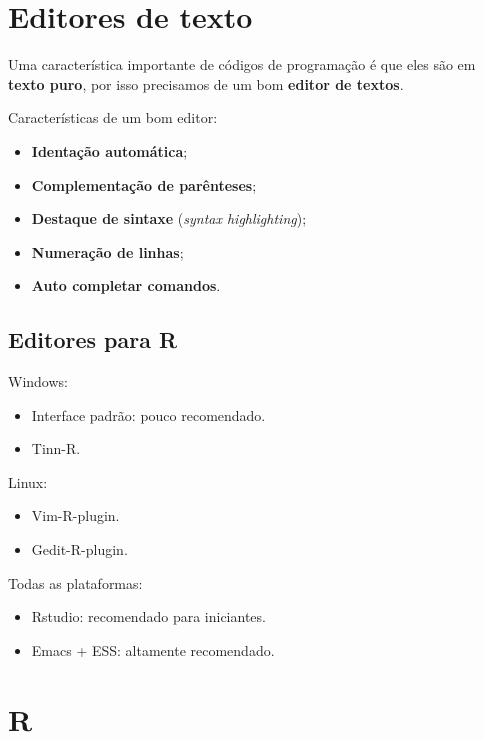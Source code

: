 \documentclass[
  10pt,
  a4paper]{book}
\providecommand{\tightlist}{%
  \setlength{\itemsep}{0pt}\setlength{\parskip}{0pt}}
\begin{document}
\hypertarget{editores-de-texto}{%
\section{Editores de texto}\label{editores-de-texto}}

Uma característica importante de códigos de programação é que eles são
em \textbf{texto puro}, por isso precisamos de um bom \textbf{editor de textos}.

Características de um bom editor:

\begin{itemize}
\tightlist
\item
  \textbf{Identação automática};
\item
  \textbf{Complementação de parênteses};
\item
  \textbf{Destaque de sintaxe} (\emph{syntax highlighting});
\item
  \textbf{Numeração de linhas};
\item
  \textbf{Auto completar comandos}.
\end{itemize}

\hypertarget{editores-para-r}{%
\subsection{Editores para R}\label{editores-para-r}}

Windows:

\begin{itemize}
\tightlist
\item
  Interface padrão: pouco recomendado.
\item
  Tinn-R.
\end{itemize}

Linux:

\begin{itemize}
\tightlist
\item
  Vim-R-plugin.
\item
  Gedit-R-plugin.
\end{itemize}

Todas as plataformas:

\begin{itemize}
\tightlist
\item
  Rstudio: recomendado para iniciantes.
\item
  Emacs + ESS: altamente recomendado.
\end{itemize}

\hypertarget{r}{%
\section{R}\label{r}}
\end{document}
